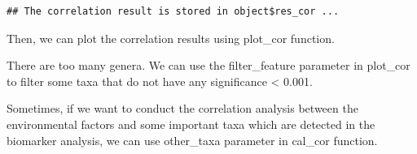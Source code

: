 \documentclass[
]{book}
\newenvironment{Shaded}{\begin{snugshade}}{\end{snugshade}}
\newcommand{\AttributeTok}[1]{\textcolor[rgb]{0.77,0.63,0.00}{#1}}
\newcommand{\CommentTok}[1]{\textcolor[rgb]{0.56,0.35,0.01}{\textit{#1}}}
\newcommand{\FunctionTok}[1]{\textcolor[rgb]{0.00,0.00,0.00}{#1}}
\newcommand{\NormalTok}[1]{#1}
\newcommand{\SpecialCharTok}[1]{\textcolor[rgb]{0.00,0.00,0.00}{#1}}
\newcommand{\StringTok}[1]{\textcolor[rgb]{0.31,0.60,0.02}{#1}}
\begin{document}
\begin{verbatim}
## The correlation result is stored in object$res_cor ...
\end{verbatim}

\begin{Shaded}
\end{Shaded}

Then, we can plot the correlation results using plot\_cor function.

\begin{Shaded}
\end{Shaded}

There are too many genera.
We can use the filter\_feature parameter in plot\_cor to filter some taxa that do not have any significance \textless{} 0.001.

\begin{Shaded}
\end{Shaded}

Sometimes, if we want to conduct the correlation analysis between the environmental factors and some important taxa which are detected in the biomarker analysis,
we can use other\_taxa parameter in cal\_cor function.
\end{document}
